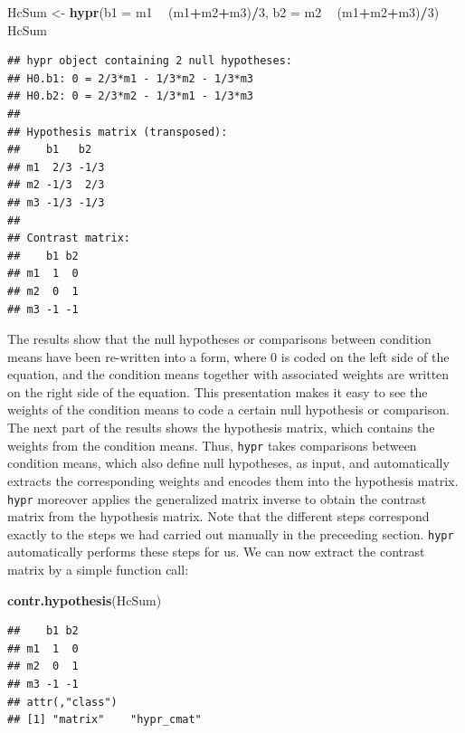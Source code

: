 \documentclass[12pt,]{krantz}
\newenvironment{Shaded}{\begin{snugshade}}{\end{snugshade}}
\newcommand{\KeywordTok}[1]{\textcolor[rgb]{0.13,0.29,0.53}{\textbf{#1}}}
\newcommand{\DataTypeTok}[1]{\textcolor[rgb]{0.13,0.29,0.53}{#1}}
\newcommand{\DecValTok}[1]{\textcolor[rgb]{0.00,0.00,0.81}{#1}}
\newcommand{\StringTok}[1]{\textcolor[rgb]{0.31,0.60,0.02}{#1}}
\newcommand{\OperatorTok}[1]{\textcolor[rgb]{0.81,0.36,0.00}{\textbf{#1}}}
\newcommand{\NormalTok}[1]{#1}
\theoremstyle{definition}
\theoremstyle{definition}
\theoremstyle{definition}
\theoremstyle{remark}
\begin{document}
\begin{Shaded}
\begin{Highlighting}[]
\NormalTok{HcSum <-}\StringTok{ }\KeywordTok{hypr}\NormalTok{(}\DataTypeTok{b1 =}\NormalTok{ m1 }\OperatorTok{~}\StringTok{ }\NormalTok{(m1}\OperatorTok{+}\NormalTok{m2}\OperatorTok{+}\NormalTok{m3)}\OperatorTok{/}\DecValTok{3}\NormalTok{, }\DataTypeTok{b2 =}\NormalTok{ m2 }\OperatorTok{~}\StringTok{ }\NormalTok{(m1}\OperatorTok{+}\NormalTok{m2}\OperatorTok{+}\NormalTok{m3)}\OperatorTok{/}\DecValTok{3}\NormalTok{)}
\NormalTok{HcSum}
\end{Highlighting}
\end{Shaded}

\begin{verbatim}
## hypr object containing 2 null hypotheses:
## H0.b1: 0 = 2/3*m1 - 1/3*m2 - 1/3*m3
## H0.b2: 0 = 2/3*m2 - 1/3*m1 - 1/3*m3
## 
## Hypothesis matrix (transposed):
##    b1   b2  
## m1  2/3 -1/3
## m2 -1/3  2/3
## m3 -1/3 -1/3
## 
## Contrast matrix:
##    b1 b2
## m1  1  0
## m2  0  1
## m3 -1 -1
\end{verbatim}

The results show that the null hypotheses or comparisons between
condition means have been re-written into a form, where \(0\) is coded
on the left side of the equation, and the condition means together with
associated weights are written on the right side of the equation. This
presentation makes it easy to see the weights of the condition means to
code a certain null hypothesis or comparison. The next part of the
results shows the hypothesis matrix, which contains the weights from the
condition means. Thus, \texttt{hypr} takes comparisons between condition
means, which also define null hypotheses, as input, and automatically
extracts the corresponding weights and encodes them into the hypothesis
matrix. \texttt{hypr} moreover applies the generalized matrix inverse to
obtain the contrast matrix from the hypothesis matrix. Note that the
different steps correspond exactly to the steps we had carried out
manually in the preceeding section. \texttt{hypr} automatically performs
these steps for us. We can now extract the contrast matrix by a simple
function call:

\begin{Shaded}
\begin{Highlighting}[]
\KeywordTok{contr.hypothesis}\NormalTok{(HcSum)}
\end{Highlighting}
\end{Shaded}

\begin{verbatim}
##    b1 b2
## m1  1  0
## m2  0  1
## m3 -1 -1
## attr(,"class")
## [1] "matrix"    "hypr_cmat"
\end{verbatim}
\end{document}
